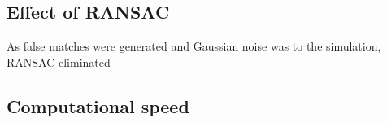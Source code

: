 \subsection{Effect of RANSAC}

As false matches were generated and Gaussian noise was to the simulation, RANSAC eliminated 


\subsection{Computational speed}